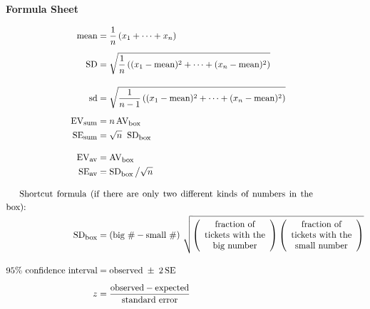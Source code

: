 \documentclass[10pt]{article}
\begin{document}
\begin{center}
\textbf{\large Formula Sheet}
\end{center}\vspace{-15pt}
\begin{align*}
\mbox{mean} &=\frac{1}{n}\left(x_1 + \cdots + x_n\right)\\[5pt]
\mbox{SD}   &=\sqrt{\frac{1}{n}\left( (x_1 - \mbox{mean})^2 + \cdots + (x_n - \mbox{mean})^2\right)}\\[10pt]
\mbox{sd}   &=\sqrt{\frac{1}{n-1}\left( (x_1 - \mbox{mean})^2 + \cdots + (x_n - \mbox{mean})^2\right)}\\[5pt]
%
\mbox{EV}_{\mbox{\footnotesize sum}} & = n\,\mbox{AV}_{\mbox{\footnotesize box}}\\
\mbox{SE}_{\mbox{\footnotesize sum}} & = \sqrt{n}\;\;\mbox{SD}_{\mbox{\footnotesize box}}\\[10pt]
%
\mbox{EV}_{\mbox{\footnotesize av}} & = \mbox{AV}_{\mbox{\footnotesize box}}\\
\mbox{SE}_{\mbox{\footnotesize av}} & = \mbox{SD}_{\mbox{\footnotesize box}}\,\big{/}\sqrt{n}\\[10pt]
%
%
\noalign{Shortcut formula (if there are only two different kinds of numbers in the box):}
\mbox{SD}_{\mbox{\footnotesize box}} &=
  \left(\mbox{big \#} - \mbox{small \#}\right)\,\sqrt{
  \left(\begin{array}{c}\mbox{fraction of}\\ \mbox{tickets with the}\\ \mbox{big number}\end{array}\right)
  \left(\begin{array}{c}\mbox{fraction of}\\\mbox{tickets with the}\\\mbox{small number}\end{array}\right)}\\[10pt]
%
\mbox{95\% confidence interval} &= \mbox{observed} \;\pm\; 2\,\mbox{SE}\\[5pt]
z &= \frac{\mbox{observed} - \mbox{expected}}{\mbox{standard error}}
\end{align*}
\eject

\end{document}
